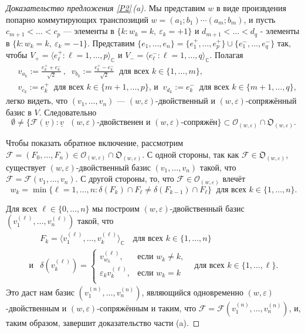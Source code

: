 \documentclass{amsart}
\theoremstyle{definition}
\begin{document}
\begin{proof}[Доказательство предложения \ref{P2}\,{\rm (a)}]
Мы представим $w$ в виде произвдения попарно коммутирующих транспозиций
$w=(a_1;b_1)\cdots(a_m;b_m)$,
и пусть $c_{m+1}<\ldots<c_p$ --- элементы в $\{k:w_k=k,\ \varepsilon_k=+1\}$
и $d_{m+1}<\ldots<d_q$ - элементы в $\{k:w_k=k,\ \varepsilon_k=-1\}$.
Представим $\{e_1,\ldots,e_n\}=\{e_1^+,\ldots,e_p^+\}\cup\{e_1^-,\ldots,e_q^-\}$
так, чтобы $V_+=\langle e_\ell^+:\ell=1,\ldots,p\rangle_\mathbb{C}$
и $V_-=\langle e_\ell^-:\ell=1,\ldots,q\rangle_\mathbb{C}$.
Полагая
\begin{eqnarray*}
& v_{a_k}:=\frac{e^+_k+e^-_k}{\sqrt{2}}\,,\,\,\ v_{b_k}:=\frac{e^+_k-e^-_k}{\sqrt{2}}\ \mbox{ для всех $k\in\{1,\ldots,m\}$,} \\
& v_{c_k}:=e^+_k\ \mbox{ для всех $k\in\{m+1,\ldots,p\}$, \ и }\ v_{d_k}:=e^-_k\ \mbox{ для всех $k\in\{m+1,\ldots,q\}$,}
\end{eqnarray*}
легко видеть, что $(v_1,\ldots,v_n)$ ---  
$(w,\varepsilon)$-двойственный и $(w,\varepsilon)$-сопряжённый базис в $V$.  Следовательно
\begin{equation}
\label{3.5.14}
\emptyset\not=\{\mathcal{F}(\underline{v}):\mbox{$\underline{v}$  $(w,\varepsilon)$-двойственен и $(w,\varepsilon)$-сопряжён}\}\subset \mathcal{O}_{(w,\varepsilon)}\cap\mathfrak{O}_{(w,\varepsilon)}.
\end{equation}

	Чтобы показать обратное  включение, рассмотрим
$\mathcal{F}=(F_0,\ldots,F_n)\in \mathcal{O}_{(w,\varepsilon)}\cap\mathfrak{O}_{(w,\varepsilon)}$.
С одной стороны, так как $\mathcal{F}\in\mathfrak{O}_{(w,\varepsilon)}$, существует  $(w,\varepsilon)$-двойственный базис $(v_1,\ldots,v_n)$ такой, что
$\mathcal{F}=\mathcal{F}(v_1,\ldots,v_n)$. С другой стороны, то, что $\mathcal{F}\in\mathcal{O}_{(w,\varepsilon)}$ влечёт
\begin{equation}
\label{8-new}
w_k=\min\{\ell=1,\ldots,n:\delta(F_k)\cap F_\ell\not=\delta(F_{k-1})\cap F_\ell\}\ \mbox{ для всех $k\in\{1,\ldots,n\}$.}
\end{equation}

Для всех $\ell\in\{0,\ldots,n\}$ мы построим $(w,\varepsilon)$-двойственный базис
$(v_1^{(\ell)},\ldots,v_n^{(\ell)})$ такой, что
\begin{eqnarray}
\label{9-new}
 & F_k=\langle v_1^{(\ell)},\ldots,v_k^{(\ell)}\rangle_\mathbb{C}\quad\mbox{для всех $k\in\{1,\ldots,n\}$}
\\
\label{10-new}
 \mbox{и} & \delta(v_k^{(\ell)})=\left\{\begin{array}{ll}
v_{w_k}^{(\ell)}, & \mbox{если $w_k\not=k$,} \\
\varepsilon_k v_{k}^{(\ell)}, & \mbox{если $w_k=k$} \\
\end{array}\right.\quad\mbox{для всех $k\in\{1,\ldots,\ell\}$.}
\end{eqnarray}
Это даст нам
базис $(v_1^{(n)},\ldots,v_n^{(n)})$, являющийся одновременно $(w,\varepsilon)$-двойственным и $(w,\varepsilon)$-сопряжённым и таким, что
$\mathcal{F}=\mathcal{F}(v_1^{(n)},\ldots,v_n^{(n)})$, и, таким образом, завершит доказательство части {\rm (a)}.


\end{proof}
\end{document}
